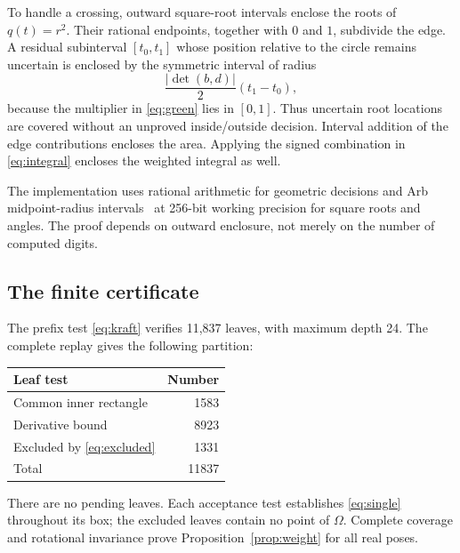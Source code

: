 \documentclass[11pt]{article}
\begin{document}
To handle a crossing, outward square-root intervals enclose the roots of $q(t)=r^2$. Their rational endpoints, together with $0$ and $1$, subdivide the edge. A residual subinterval $[t_0,t_1]$ whose position relative to the circle remains uncertain is enclosed by the symmetric interval of radius
\[
\frac{|\det(b,d)|}{2}(t_1-t_0),
\]
because the multiplier in \eqref{eq:green} lies in $[0,1]$. Thus uncertain root locations are covered without an unproved inside/outside decision. Interval addition of the edge contributions encloses the area. Applying the signed combination in \eqref{eq:integral} encloses the weighted integral as well.

The implementation uses rational arithmetic for geometric decisions and Arb midpoint-radius intervals~\cite{johansson} at 256-bit working precision for square roots and angles. The proof depends on outward enclosure, not merely on the number of computed digits.

\subsection{The finite certificate}
The prefix test \eqref{eq:kraft} verifies 11,837 leaves, with maximum depth 24. The complete replay gives the following partition:
\begin{center}
\begin{tabular}{lr}
\toprule
Leaf test & Number\\
\midrule
Common inner rectangle & 1583\\
Derivative bound & 8923\\
Excluded by \eqref{eq:excluded} & 1331\\
\midrule
Total & 11837\\
\bottomrule
\end{tabular}
\end{center}
There are no pending leaves. Each acceptance test establishes \eqref{eq:single} throughout its box; the excluded leaves contain no point of $\Omega$. Complete coverage and rotational invariance prove Proposition~\ref{prop:weight} for all real poses.

\end{document}
